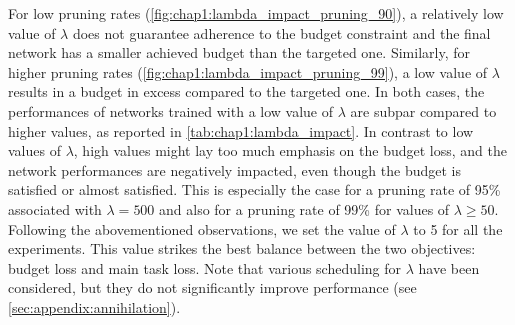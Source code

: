 For low pruning rates (\cref{fig:chap1:lambda_impact_pruning_90}), a relatively
low value of $\lambda$ does not guarantee adherence to the budget constraint and
the final network has a smaller achieved budget than the targeted one.
Similarly, for higher pruning rates (\cref{fig:chap1:lambda_impact_pruning_99}),
a low value of $\lambda$ results in a budget in excess compared to the targeted
one. In both cases, the performances of networks trained with a low value of
$\lambda$ are subpar compared to higher values, as reported in
\cref{tab:chap1:lambda_impact}. In contrast to low values of $\lambda$, high
values might lay too much emphasis on the budget loss, and the network
performances are negatively impacted, even though the budget is satisfied or
almost satisfied. This is especially the case for a pruning rate of 95\%
associated with $\lambda=500$ and also for a pruning rate of 99\% for values of
$\lambda \geq 50$. Following the abovementioned observations, we set the value
of $\lambda$ to 5 for all the experiments. This value strikes the best balance
between the two objectives: budget loss and main task loss. Note that various
scheduling for $\lambda$ have been considered, but they do not significantly
improve performance (see \cref{sec:appendix:annihilation}).


